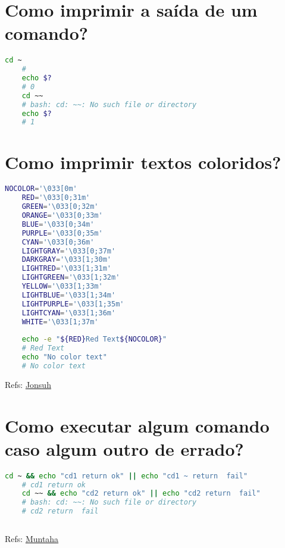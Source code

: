 \section{Como imprimir a saída de um comando?} 
\begin{lstlisting}[language=bash]
	cd ~
	# 
	echo $?
	# 0
	cd ~~
	# bash: cd: ~~: No such file or directory
	echo $?
	# 1
\end{lstlisting}
\section{Como imprimir textos coloridos?} 

\begin{lstlisting}[language=bash]
	NOCOLOR='\033[0m'
	RED='\033[0;31m'
	GREEN='\033[0;32m'
	ORANGE='\033[0;33m'
	BLUE='\033[0;34m'
	PURPLE='\033[0;35m'
	CYAN='\033[0;36m'
	LIGHTGRAY='\033[0;37m'
	DARKGRAY='\033[1;30m'
	LIGHTRED='\033[1;31m'
	LIGHTGREEN='\033[1;32m'
	YELLOW='\033[1;33m'
	LIGHTBLUE='\033[1;34m'
	LIGHTPURPLE='\033[1;35m'
	LIGHTCYAN='\033[1;36m'
	WHITE='\033[1;37m'
	
	echo -e "${RED}Red Text${NOCOLOR}"
	# Red Text
	echo "No color text"
	# No color text
\end{lstlisting}
Refs: \href{https://gist.github.com/jonsuh/3c89c004888dfc7352be}{Jonsuh}

\section{Como executar algum comando caso algum outro de errado?} 

\begin{lstlisting}[language=bash]
	cd ~ && echo "cd1 return ok" || echo "cd1 ~ return  fail"
	# cd1 return ok
	cd ~~ && echo "cd2 return ok" || echo "cd2 return  fail"
	# bash: cd: ~~: No such file or directory
	# cd2 return  fail
	
\end{lstlisting}
Refs: \href{https://linuxhint.com/check_command_succeeded_bash/}{Muntaha}